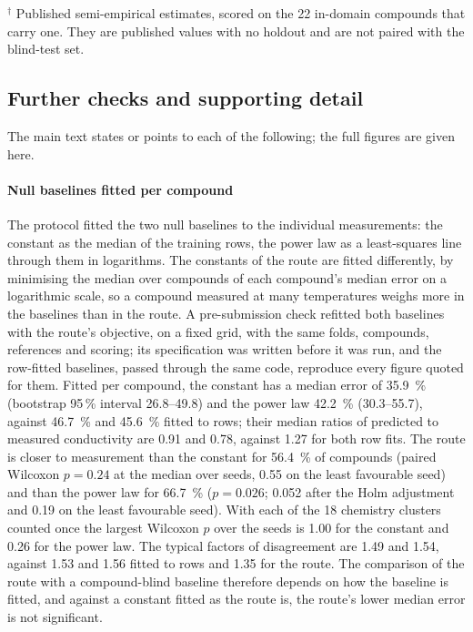 \documentclass[preprint, 12pt]{elsarticle}
\begin{document}
\begin{table}[!htbp]
  \vspace{2pt}
  \begin{minipage}{\linewidth}\footnotesize
    $^{\dagger}$ Published semi-empirical estimates, scored on the \num{22} in-domain compounds that
    carry one. They are published values with no holdout and are not paired with the blind-test set.
  \end{minipage}
\end{table}

\subsection{Further checks and supporting detail}
\label{sec:blindchecks}

The main text states or points to each of the following; the full figures are given here.

\paragraph{Null baselines fitted per compound} The protocol fitted the two null baselines to the
individual measurements: the constant as the median of the training rows, the power law as a
least-squares line through them in logarithms. The constants of the route are fitted differently, by
minimising the median over compounds of each compound's median error on a logarithmic scale, so a
compound measured at many temperatures weighs more in the baselines than in the route. A
pre-submission check refitted both baselines with the route's objective, on a fixed grid, with the
same folds, compounds, references and scoring; its specification was written before it was run, and
the row-fitted baselines, passed through the same code, reproduce every figure quoted for them.
Fitted per compound, the constant has a median error of \SI{35.9}{\percent} (bootstrap 95\,\%
interval \numrange{26.8}{49.8}) and the power law \SI{42.2}{\percent} (\numrange{30.3}{55.7}),
against \SI{46.7}{\percent} and \SI{45.6}{\percent} fitted to rows; their median ratios of predicted
to measured conductivity are \num{0.91} and \num{0.78}, against \num{1.27} for both row fits. The
route is closer to measurement than the constant for \SI{56.4}{\percent} of compounds (paired
Wilcoxon $p=\num{0.24}$ at the median over seeds, \num{0.55} on the least favourable seed) and than
the power law for \SI{66.7}{\percent} ($p=\num{0.026}$; \num{0.052} after the Holm adjustment and
\num{0.19} on the least favourable seed). With each of the \num{18} chemistry clusters counted once
the largest Wilcoxon $p$ over the seeds is \num{1.00} for the constant and \num{0.26} for the power
law. The typical factors of disagreement are \num{1.49} and \num{1.54}, against \num{1.53} and
\num{1.56} fitted to rows and \num{1.35} for the route. The comparison of the route with a
compound-blind baseline therefore depends on how the baseline is fitted, and against a constant
fitted as the route is, the route's lower median error is not significant.
\end{document}
